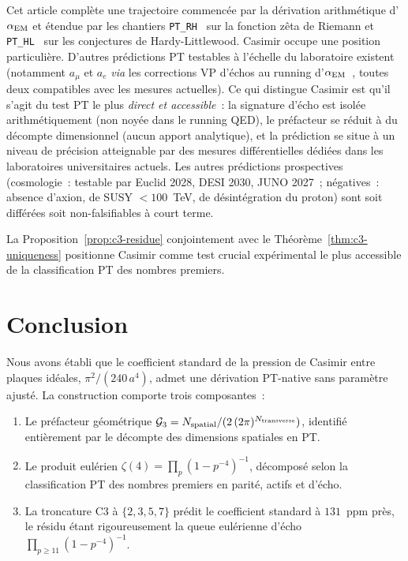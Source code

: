 \documentclass[11pt,a4paper]{article}
\newcommand{\PTset}{\{2,3,5,7\}}
\newcommand{\Nspatial}{N_{\rm spatial}}
\newcommand{\Ntrans}{N_{\rm transverse}}
\begin{document}
Cet article complète une trajectoire commencée par la dérivation arithmétique d'$\alpha_{\rm EM}$
et étendue par les chantiers \texttt{PT\_RH}~\cite{Senez2026RH} sur la fonction zêta de Riemann
et \texttt{PT\_HL}~\cite{Senez2026HL} sur les conjectures de Hardy-Littlewood. Casimir occupe
une position particulière. D'autres prédictions PT testables à l'échelle du laboratoire existent
(notamment $a_\mu$ et $a_e$ \emph{via} les corrections VP d'échos au running
d'$\alpha_{\rm EM}$~\cite{Senez2026}, toutes deux compatibles avec les mesures actuelles).
Ce qui distingue Casimir est qu'il s'agit du test PT le plus \emph{direct et accessible}~: la
signature d'écho est isolée arithmétiquement (non noyée dans le running QED), le préfacteur
se réduit à du décompte dimensionnel (aucun apport analytique), et la prédiction se situe à
un niveau de précision atteignable par des mesures différentielles dédiées dans les
laboratoires universitaires actuels. Les autres prédictions prospectives (cosmologie~:
testable par Euclid 2028, DESI 2030, JUNO 2027~; négatives~: absence d'axion, de SUSY $<
100$~TeV, de désintégration du proton) sont soit différées soit non-falsifiables à court terme.

La Proposition~\ref{prop:c3-residue} conjointement avec le Théorème~\ref{thm:c3-uniqueness}
positionne Casimir comme test crucial expérimental le plus accessible de la classification PT
des nombres premiers.

\section{Conclusion}

Nous avons établi que le coefficient standard de la pression de Casimir entre plaques idéales,
$\pi^{2}/(240\,a^{4})$, admet une dérivation PT-native sans paramètre ajusté. La construction
comporte trois composantes~:
\begin{enumerate}
  \item Le préfacteur géométrique
  $\mathcal{G}_{3} = \Nspatial/(2\,(2\pi)^{\Ntrans})$, identifié entièrement par le décompte
  des dimensions spatiales en PT.
  \item Le produit eulérien $\zeta(4) = \prod_{p}(1-p^{-4})^{-1}$, décomposé selon la
  classification PT des nombres premiers en parité, actifs et d'écho.
  \item La troncature C3 à $\PTset$ prédit le coefficient standard à $131$~ppm près, le résidu
  étant rigoureusement la queue eulérienne d'écho $\prod_{p \geq 11}(1-p^{-4})^{-1}$.
\end{enumerate}
\end{document}
